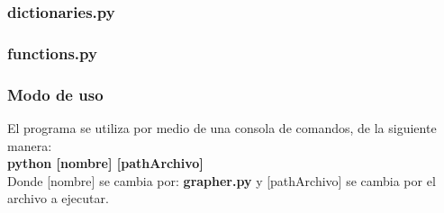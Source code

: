 \newpage
\subsubsection{dictionaries.py}


\newpage
\subsubsection{functions.py}



\newpage
\subsubsection{Modo de uso}
El programa se utiliza por medio de una consola de comandos, de la siguiente manera:\\
\textbf{ python [nombre] [pathArchivo]} \\ 
Donde [nombre] se cambia por: \textbf{grapher.py}
y [pathArchivo] se cambia por el archivo a ejecutar.
